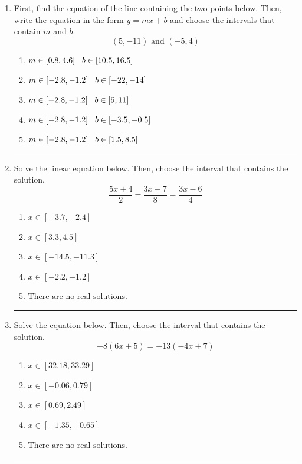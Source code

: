 \documentclass[14pt]{extbook}
\newcommand{\litem}[1]{\item#1\hspace*{-1cm}\rule{\textwidth}{0.4pt}}
\begin{document}
\begin{enumerate}
{\begin{enumerate}[label=\Alph*.]
\end{enumerate} }
\litem{
First, find the equation of the line containing the two points below. Then, write the equation in the form $ y=mx+b $ and choose the intervals that contain $m$ and $b$.\[ (5, -11) \text{ and } (-5, 4) \]\begin{enumerate}[label=\Alph*.]
\item \( m \in [0.8, 4.6] \hspace*{3mm} b \in [10.5, 16.5] \)
\item \( m \in [-2.8, -1.2] \hspace*{3mm} b \in [-22, -14] \)
\item \( m \in [-2.8, -1.2] \hspace*{3mm} b \in [5, 11] \)
\item \( m \in [-2.8, -1.2] \hspace*{3mm} b \in [-3.5, -0.5] \)
\item \( m \in [-2.8, -1.2] \hspace*{3mm} b \in [1.5, 8.5] \)

\end{enumerate} }
\litem{
Solve the linear equation below. Then, choose the interval that contains the solution.\[ \frac{5x + 4}{2} - \frac{3x -7}{8} = \frac{3x -6}{4} \]\begin{enumerate}[label=\Alph*.]
\item \( x \in [-3.7, -2.4] \)
\item \( x \in [3.3, 4.5] \)
\item \( x \in [-14.5, -11.3] \)
\item \( x \in [-2.2, -1.2] \)
\item \( \text{There are no real solutions.} \)

\end{enumerate} }
\litem{
Solve the equation below. Then, choose the interval that contains the solution.\[ -8(6x + 5) = -13(-4x + 7) \]\begin{enumerate}[label=\Alph*.]
\item \( x \in [32.18, 33.29] \)
\item \( x \in [-0.06, 0.79] \)
\item \( x \in [0.69, 2.49] \)
\item \( x \in [-1.35, -0.65] \)
\item \( \text{There are no real solutions.} \)


\end{enumerate}}
\end{enumerate}
\end{document}
